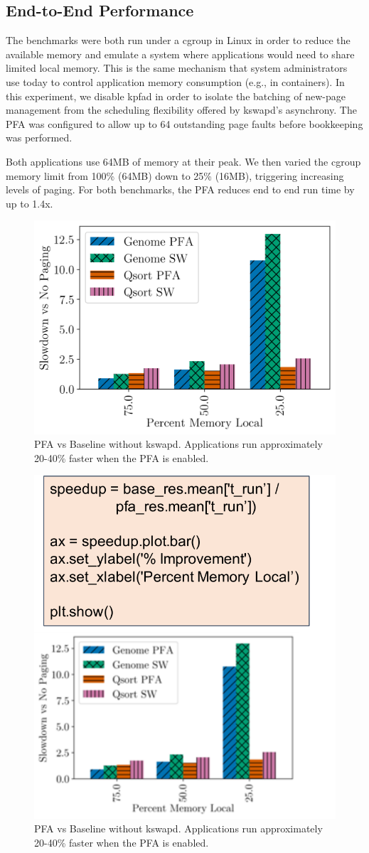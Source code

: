 \subsection{End-to-End Performance} \label{sec:fullPerf}
  The benchmarks were both run under a cgroup in Linux in order to reduce the
  available memory and emulate a system where applications would need to share
  limited local memory. This is the same mechanism that system administrators
  use today to control application memory consumption (e.g., in containers). In
  this experiment, we disable kpfad in order to isolate the batching of
  new-page management from the scheduling flexibility offered by kswapd's
  asynchrony.  The PFA was configured to allow up to 64 outstanding page faults
  before bookkeeping was performed.
  \newline
  \newline
  

  Both applications use 64MB of memory at their peak. We then
  varied the cgroup memory limit from 100\% (64MB) down to 25\% (16MB),
  triggering increasing levels of paging. For both benchmarks, the PFA reduces
  end to end run time by up to 1.4x.

  \begin{figure}[bht] \centering
    \includegraphics[width=0.5\columnwidth]{figs/perf_nokswapd.png}
    \vspace{+1cm}
    \caption{PFA vs Baseline without kswapd. Applications run approximately
    20-40\% faster when the PFA is enabled.}
    \label{fig:pfa_perf}
  \end{figure}

  \begin{figure}[bht] \centering
    \includegraphics[width=0.5\columnwidth]{figs/perf_user.pdf}
    \vspace{+1cm}
    \caption{PFA vs Baseline without kswapd. Applications run approximately
    20-40\% faster when the PFA is enabled.}
    \label{fig:pfa_perf}
  \end{figure}

